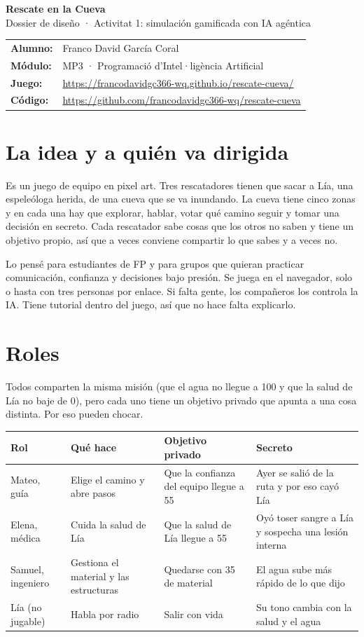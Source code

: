 \documentclass[11pt,a4paper]{article}
\begin{document}
{\LARGE\bfseries Rescate en la Cueva}\\[2pt]
{\large Dossier de diseño · Activitat 1: simulación gamificada con IA agéntica}

\vspace{4pt}
\begin{tabular}{@{}ll}
\textbf{Alumno:} & Franco David García Coral\\
\textbf{Módulo:} & MP3 · Programació d'Intel·ligència Artificial\\
\textbf{Juego:} & \url{https://francodavidgc366-wq.github.io/rescate-cueva/}\\
\textbf{Código:} & \url{https://github.com/francodavidgc366-wq/rescate-cueva}\\
\end{tabular}

\section{La idea y a quién va dirigida}
Es un juego de equipo en pixel art. Tres rescatadores tienen que sacar a Lía, una espeleóloga herida, de una cueva que se va inundando. La cueva tiene cinco zonas y en cada una hay que explorar, hablar, votar qué camino seguir y tomar una decisión en secreto. Cada rescatador sabe cosas que los otros no saben y tiene un objetivo propio, así que a veces conviene compartir lo que sabes y a veces no.

Lo pensé para estudiantes de FP y para grupos que quieran practicar comunicación, confianza y decisiones bajo presión. Se juega en el navegador, solo o hasta con tres personas por enlace. Si falta gente, los compañeros los controla la IA. Tiene tutorial dentro del juego, así que no hace falta explicarlo.

\section{Roles}
Todos comparten la misma misión (que el agua no llegue a 100 y que la salud de Lía no baje de 0), pero cada uno tiene un objetivo privado que apunta a una cosa distinta. Por eso pueden chocar.

\begin{tabularx}{\textwidth}{@{}p{2.9cm}p{3.5cm}p{3.5cm}X@{}}
\toprule
\textbf{Rol} & \textbf{Qué hace} & \textbf{Objetivo privado} & \textbf{Secreto} \\
\midrule
Mateo, guía & Elige el camino y abre pasos & Que la confianza del equipo llegue a 55 & Ayer se salió de la ruta y por eso cayó Lía \\
Elena, médica & Cuida la salud de Lía & Que la salud de Lía llegue a 55 & Oyó toser sangre a Lía y sospecha una lesión interna \\
Samuel, ingeniero & Gestiona el material y las estructuras & Quedarse con 35 de material & El agua sube más rápido de lo que dijo \\
Lía (no jugable) & Habla por radio & Salir con vida & Su tono cambia con la salud y el agua \\
\bottomrule
\end{tabularx}
\end{document}
